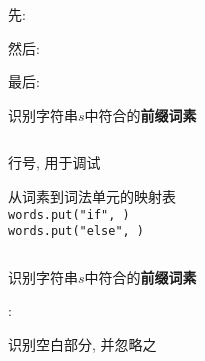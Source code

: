 \begin{frame}{}
  \begin{center}
    先: \ws \quad \ifkw \quad \elsekw \quad \id \quad \intnum 

    \vspace{1.00cm}
    然后: \relop 
    
    \vspace{1.00cm}
    最后: \floatnum \quad \scinum

    \vspace{1.00cm}
  \end{center}
\end{frame}

\begin{frame}{}
  \begin{center}
    识别字符串$s$中符合的{\bf 前缀词素}

    \vspace{0.20cm}

    \vspace{0.30cm}
    \begin{columns}
        \begin{description}
          \setlength{\itemsep}{8pt}
          \item[line:] 行号, 用于调试
          \item[peek:] 
          \item[words:] 从词素到词法单元的映射表 \\[5pt]
            \texttt{words.put("if", \ifkw)} \\
            \texttt{words.put("else", \elsekw)}
        \end{description}
    \end{columns}
  \end{center}
\end{frame}

\begin{frame}{}
  \begin{center}
    识别字符串$s$中符合的{\bf 前缀词素}

    \vspace{0.50cm}
    \ws: \blank \quad \tab \quad \line

    \pause
    \vspace{0.50cm}

    识别空白部分, 并忽略之

    \pause
    \vspace{0.50cm}
  \end{center}
\end{frame}

